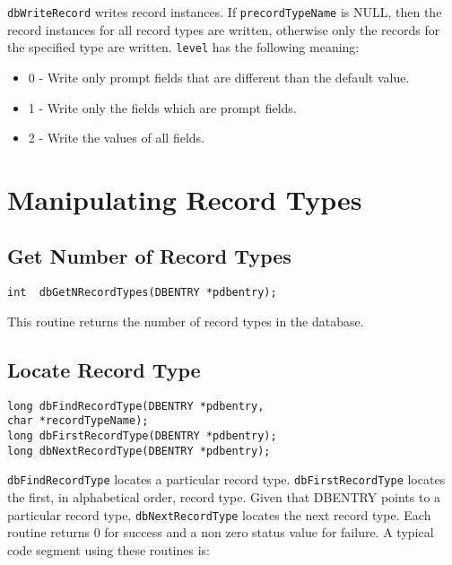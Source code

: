 \verb|dbWriteRecord| writes record instances. If \verb|precordTypeName| is NULL, then the record instances for all record 
types are written, otherwise only the records for the specified type are written. \verb|level| has the following meaning:

\begin{itemize}
\item 0 - Write only prompt fields that are different than the default value.

\item 1 - Write only the fields which are prompt fields.

\item 2 - Write the values of all fields.

\end{itemize}

\section{Manipulating Record Types}

\subsection{Get Number of Record Types}

\begin{verbatim}
int  dbGetNRecordTypes(DBENTRY *pdbentry);
\end{verbatim}

This routine returns the number of record types in the database.

\subsection{Locate Record Type}

\begin{verbatim}
long dbFindRecordType(DBENTRY *pdbentry,
char *recordTypeName);
long dbFirstRecordType(DBENTRY *pdbentry);
long dbNextRecordType(DBENTRY *pdbentry);
\end{verbatim}

\verb|dbFindRecordType| locates a particular record type. \verb|dbFirstRecordType| locates the first, in alphabetical order, 
record type. Given that DBENTRY points to a particular record type, \verb|dbNextRecordType| locates the next record type. 
Each routine returns 0 for success and a non zero status value for failure. A typical code segment using these routines is:

